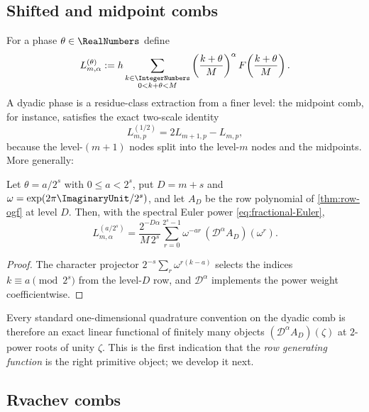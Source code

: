 \documentclass[11pt,oneside]{article}
\numberwithin{equation}{section}
\theoremstyle{definition}
\theoremstyle{remark}
\newcommand{\Dop}{\mathcal D}
\begin{document}
\subsection{Shifted and midpoint combs}

For a phase $\theta\in\RealNumbers$ define
\begin{equation}
 L_{m,\alpha}^{(\theta)}
 :=h\sum_{\substack{k\in\IntegerNumbers\\0<k+\theta<M}}
 \left(\frac{k+\theta}{M}\right)^{\alpha}
 F\!\left(\frac{k+\theta}{M}\right).
 \label{eq:shifted-comb}
\end{equation}
A dyadic phase is a residue-class extraction from a finer level: the
midpoint comb, for instance, satisfies the exact two-scale identity
\begin{equation}
 L^{(1/2)}_{m,p}
 =2L_{m+1,p}-L_{m,p},
 \label{eq:midpoint}
\end{equation}
because the level-$(m{+}1)$ nodes split into the level-$m$ nodes and
the midpoints.  More generally:

\begin{proposition}
\label{prop:roots-of-unity}
Let $\theta=a/2^{s}$ with $0\le a<2^{s}$, put $D=m+s$ and
$\omega=\exp(2\pi\ImaginaryUnit/2^{s})$, and let $A_D$ be the row polynomial of
\cref{thm:row-ogf} at level $D$.  Then, with the spectral Euler power
\eqref{eq:fractional-Euler},
\begin{equation}
 L_{m,\alpha}^{(a/2^{s})}
 =\frac{2^{-D\alpha}}{M\,2^{s}}
 \sum_{r=0}^{2^{s}-1}\omega^{-ar}\,
 (\Dop^{\alpha}A_D)(\omega^{r}).
 \label{eq:root-filter}
\end{equation}
\end{proposition}

\begin{proof}
The character projector $2^{-s}\sum_r\omega^{r(k-a)}$ selects the
indices $k\equiv a\pmod{2^{s}}$ from the level-$D$ row, and
$\Dop^\alpha$ implements the power weight coefficientwise.
\end{proof}

Every standard one-dimensional quadrature convention on the dyadic comb
is therefore an exact linear functional of finitely many objects
$(\Dop^{\alpha}A_D)(\zeta)$ at $2$-power roots of unity $\zeta$.  This
is the first indication that the \emph{row generating function} is the
right primitive object; we develop it next.

\subsection{Rvachev combs}
\end{document}
